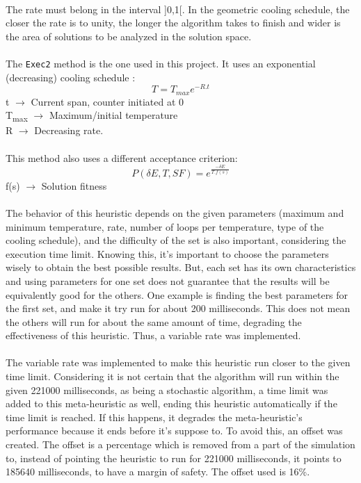 \\
The rate must belong in the interval ]0,1[. In the geometric cooling schedule, the closer the rate is to unity, the longer the algorithm takes to finish and wider is the area of solutions to be analyzed in the solution space.\\
\\
The \verb+Exec2+ method is the one used in this project. It uses an exponential (decreasing) cooling schedule \cite{CarvalhoLisbonNovember2004}:\\
\[T = T_{max}e^{-R.t} \]
t $\rightarrow$ Current span, counter initiated at 0\\
T\textsubscript{max} $\rightarrow$ Maximum/initial temperature\\
R $\rightarrow$ Decreasing rate.\\
\\
This method also uses a different acceptance criterion:\\
\[P(\delta E, T, SF) = e^{\frac{-\delta E}{T.f(s)}} \]
f(s) $\rightarrow$ Solution fitness\\
\\
The behavior of this heuristic depends on the given parameters (maximum and minimum temperature, rate, number of loops per temperature, type of the cooling schedule), and the difficulty of the set is also important, considering the execution time limit. Knowing this, it's important to choose the parameters wisely to obtain the best possible results. But, each set has its own characteristics and using parameters for one set does not guarantee that the results will be equivalently good for the others. One example is finding the best parameters for the first set, and make it try run for about 200 milliseconds. This does not mean the others will run for about the same amount of time, degrading the effectiveness of this heuristic. Thus, a variable rate was implemented.\\
\\
The variable rate was implemented to make this heuristic run closer to the given time limit. Considering it is not certain that the algorithm will run within the given 221000 milliseconds, as being a stochastic algorithm, a time limit was added to this meta-heuristic as well, ending this heuristic automatically if the time limit is reached. If this happens, it degrades the meta-heuristic's performance because it ends before it's suppose to. To avoid this, an offset was created. The offset is a percentage which is removed from a part of the simulation to, instead of pointing the heuristic to run for 221000 milliseconds, it points to 185640 milliseconds, to have a margin of safety. The offset used is 16\%.\\

